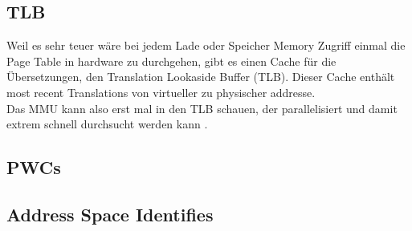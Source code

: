 \subsection{TLB}
Weil es sehr teuer wäre bei jedem Lade oder Speicher Memory Zugriff einmal die Page Table in hardware zu durchgehen,
gibt es einen Cache für die Übersetzungen, den Translation Lookaside Buffer (TLB). Dieser Cache enthält
most recent Translations von virtueller zu physischer addresse.\\
Das MMU kann also erst mal in den TLB schauen, der parallelisiert und damit extrem schnell durchsucht
werden kann \cite{drepper2007every}.


\cite{jacobVirtualMemoryContemporary1998}

\subsection{PWCs}
\cite{barrTranslationCachingSkip}
\cite{yaniv2016hash}

\subsection{Address Space Identifies}








